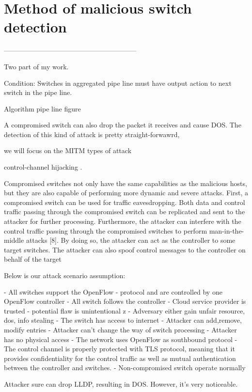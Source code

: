 \chapter{Method of malicious switch detection}

-----------------------------------------------------------

Two part of my work.

Condition: Switches in aggregated pipe line must have output action to next switch in the pipe line.



Algorithm pipe line figure~~~~~~~~~~~~~~~~~~


A compromised switch can also drop the packet it receives and cause DOS. The detection of this kind of attack is pretty straight-forwawrd, 

we will focus on the MITM types of attack


control-channel hijacking \cite{AAS14}. 


Compromised switches not only have the same capabilities as the malicious hosts, but they are also capable of performing more dynamic and severe attacks.
First, a compromised switch can be used for traffic eavesdropping. Both data and control traffic passing through the compromised switch can be replicated and sent to the attacker for further processing. Furthermore, the
attacker can interfere with the control traffic passing through the compromised
switches to perform man-in-the-middle attacks [8]. By doing so, the
attacker can act as the controller to some target switches. The attacker can
also spoof control messages to the controller on behalf of the target

Below is our attack scenario assumption: 

- All switches support the OpenFlow
- protocol and are controlled by one OpenFlow controller
- All switch follows the controller
- Cloud service provider is trusted
- potential flaw is unintentional z
- Adversary either gain unfair resource, dos, info stealing
- The switch has access to internet
- Attacker can add,remove, modify entries
- Attacker can’t change the way of switch processing
- Attacker has no physical access
- The network uses OpenFlow as southbound protocol
- The control channel is properly protected with TLS protocol, meaning
that it provides confidentiality for the control traffic as well as mutual
authentication between the controller and switches.
- Non-compromised switch operate normally

Attacker sure can drop LLDP, resulting in DOS. However, it’s very noticeable.

